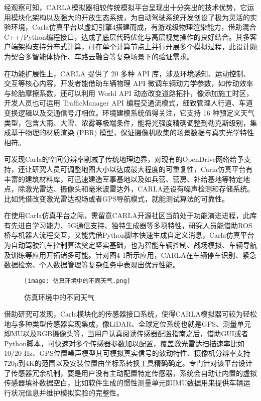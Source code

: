 经观察可知，CARLA模拟器相较传统模拟平台呈现出十分突出的技术优势，它运用模块化架构以及强大的开放生态系统，为自动驾驶系统开发创设了极为灵活的实验环境，Carla仿真平台以虚幻引擎4搭建而成，有游戏级物理渲染能力，借助混合C++/Python编程接口，达成了底层代码优化与高层视觉操作的良好结合。其多客户端架构支持分布式计算，可在单个计算节点上并行开展多个模拟过程，此设计颇为契合多智能体协作、车路云融合等复杂场景下的验证需求。

在功能扩展性上，CARLA 提供了 20 多种 API 库，涉及环境感知、运动控制、交互等核心内容，开发者能借助车辆物理 API 微调车辆动力学参数，如传动效率与轮胎摩擦系数，还可以利用 World API 动态改变道路拓扑，像添加施工时区，开发人员也可运用 TrafficManager API 编程交通流模式，细致管理人行道、车道变换逻辑以及交通信号灯相位。环境建模系统值得关注，它支持 16 种预定义天气类型，包含大雨、大雪、浓雾等极端条件，能将光强度精确调整到勒克斯级别，集成基于物理的材质渲染 (PBR) 模型，保证摄像机收集的场景数据与真实光学特性相符。

可发现Carla的空间分辨率削减了传统地理边界，对现有的OpenDrive网络给予支持，还让研究人员可调整地图大小以达成最大程度的可重复性，Carla仿真平台有丰富的建筑材料库，可迅速建造军事基地以及如兵营、营房、补给基地等特定地点，除激光雷达、摄像头和毫米波雷达外，CARLA还设有噪声检测和存储系统。比如凭借改变激光雷达视场或者GPS导航模式，就能测试算法的可靠性。

在使用Carla仿真平台之际，需留意CARLA开源社区当前处于功能演进进程，此库有先进自学习能力、5G通信支持、独特生成器等多项特性，研究人员能借助ROS桥与机器人流程交互，又能凭借Python脚本快速生成自定义消息，Carla仿真平台为自动驾驶汽车控制算法奠定坚实基础，也为智能车辆控制、战场模拟、车辆导航及训练等应用开拓诸多可能。针对图4-1所示应用，CARLA在车辆停车识别、紧急数据检索、个人数据管理等复杂任务中表现出优异性能。

\begin{figure}[hbt]
	\centering
	\texttt{[image: 仿真环境中的不同天气.png]}
	\caption{仿真环境中的不同天气}
	\label{f.example}
\end{figure}

借助研究可发现，Carla模块化的传感器接口系统，使得CARLA模拟器可较为轻松地与多种类型传感器实现集成，像LiDAR、全球定位系统也就是GPS、测量单元即MU以及RGB摄像头等，当用户认真阅读传感器配置指南之后，借助GUI或者Python脚本，可快速对多个传感器参数加以配置，覆盖激光雷达扫描速率比如10/20 Hz、GPS位置噪声模型其可模拟真实信号的波动特性、摄像机分辨率支持720p到4K的范围以及安装位置由坐标系转换工具精确确定。专门针对该平台设计了传感器冗余机制，要是用户没有主动配置特定传感器，系统会自动让内置的虚拟传感器填补数据空白，比如软件生成的惯性测量单元即IMU数据用来提供车辆运行状况信息并维护模拟实验的完整性。

